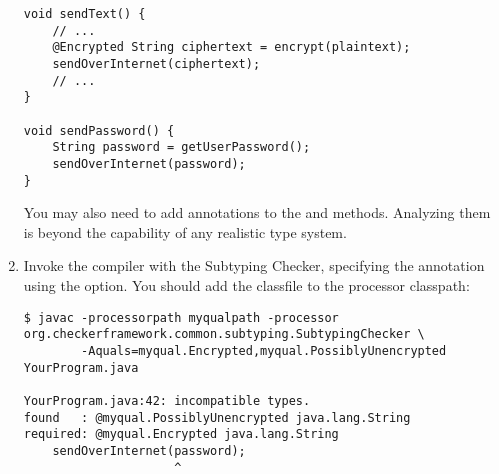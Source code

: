 \begin{enumerate}
\begin{Verbatim}
void sendText() {
    // ...
    @Encrypted String ciphertext = encrypt(plaintext);
    sendOverInternet(ciphertext);
    // ...
}

void sendPassword() {
    String password = getUserPassword();
    sendOverInternet(password);
}
\end{Verbatim}

You may also need to add  annotations to the
 and  methods.  Analyzing them is beyond the
capability of any realistic type system.

\item
  Invoke the compiler with the Subtyping Checker, specifying the
   annotation using the  option.
  You should add the  classfile to the processor classpath:

\begin{smaller}
\begin{Verbatim}
$ javac -processorpath myqualpath -processor org.checkerframework.common.subtyping.SubtypingChecker \
        -Aquals=myqual.Encrypted,myqual.PossiblyUnencrypted YourProgram.java

YourProgram.java:42: incompatible types.
found   : @myqual.PossiblyUnencrypted java.lang.String
required: @myqual.Encrypted java.lang.String
    sendOverInternet(password);
                     ^
\end{Verbatim}
\end{smaller}

\end{enumerate}



